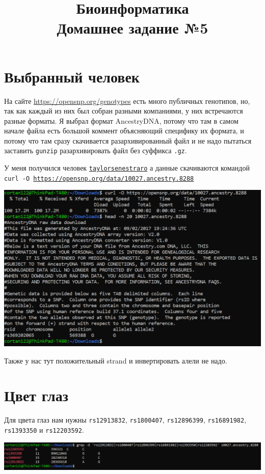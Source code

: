 \documentclass{article}
\title{Биоинформатика \\ Домашнее задание №5}
\begin{document}
  \maketitle

  \section{Выбранный человек} %
  На сайте \url{https://opensnp.org/genotypes} есть много публичных генотипов,
  но, так как каждый из них был собран разными компаниями, у них встречаются разные форматы.
  Я выбрал формат AncestryDNA, потому что %
  там в самом начале файла есть большой коммент объясняющий специфику их формата,
  и потому что там сразу скачивается разархивированный файл
  и не надо пытаться заставить \texttt{gunzip} разархивировать файл без суффикса \texttt{.gz}.

  У меня получился человек \href{https://opensnp.org/users/10027}{\texttt{taylorsenestraro}} а данные скачиваются командой
  \texttt{curl -O \url{https://opensnp.org/data/10027.ancestry.8288}}

  \noindent
  \includegraphics[width=\textwidth]{image20210313144544.png}

  Также у нас тут положительный strand и инвертировать алели не надо.

  \section{Цвет глаз}
  Для цвета глаз нам нужны
  \texttt{rs12913832}, \texttt{rs1800407}, \texttt{rs12896399}, \texttt{rs16891982}, \texttt{rs1393350} и \texttt{rs12203592}.

  \noindent
  \includegraphics[width=\textwidth]{image20210313150216.png}
\end{document}
